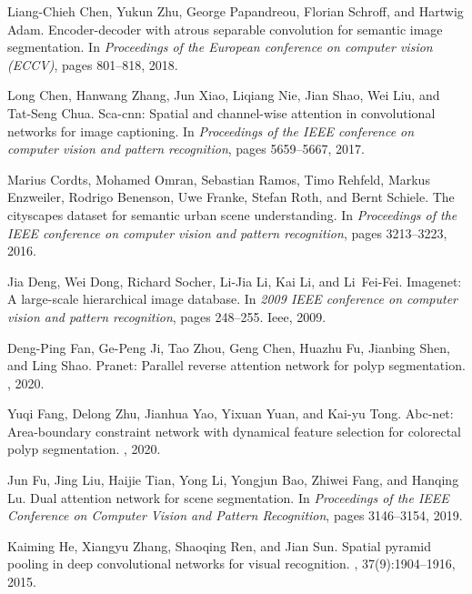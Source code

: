 \documentclass{article}
\begin{document}
\begin{thebibliography}{10}
Liang-Chieh Chen, Yukun Zhu, George Papandreou, Florian Schroff, and Hartwig
  Adam.
\newblock Encoder-decoder with atrous separable convolution for semantic image
  segmentation.
\newblock In {\em Proceedings of the European conference on computer vision
  (ECCV)}, pages 801--818, 2018.

Long Chen, Hanwang Zhang, Jun Xiao, Liqiang Nie, Jian Shao, Wei Liu, and
  Tat-Seng Chua.
\newblock Sca-cnn: Spatial and channel-wise attention in convolutional networks
  for image captioning.
\newblock In {\em Proceedings of the IEEE conference on computer vision and
  pattern recognition}, pages 5659--5667, 2017.

Marius Cordts, Mohamed Omran, Sebastian Ramos, Timo Rehfeld, Markus Enzweiler,
  Rodrigo Benenson, Uwe Franke, Stefan Roth, and Bernt Schiele.
\newblock The cityscapes dataset for semantic urban scene understanding.
\newblock In {\em Proceedings of the IEEE conference on computer vision and
  pattern recognition}, pages 3213--3223, 2016.

Jia Deng, Wei Dong, Richard Socher, Li-Jia Li, Kai Li, and Li~Fei-Fei.
\newblock Imagenet: A large-scale hierarchical image database.
\newblock In {\em 2009 IEEE conference on computer vision and pattern
  recognition}, pages 248--255. Ieee, 2009.

Deng-Ping Fan, Ge-Peng Ji, Tao Zhou, Geng Chen, Huazhu Fu, Jianbing Shen, and
  Ling Shao.
\newblock Pranet: Parallel reverse attention network for polyp segmentation.
, 2020.

Yuqi Fang, Delong Zhu, Jianhua Yao, Yixuan Yuan, and Kai-yu Tong.
\newblock Abc-net: Area-boundary constraint network with dynamical feature
  selection for colorectal polyp segmentation.
, 2020.

Jun Fu, Jing Liu, Haijie Tian, Yong Li, Yongjun Bao, Zhiwei Fang, and Hanqing
  Lu.
\newblock Dual attention network for scene segmentation.
\newblock In {\em Proceedings of the IEEE Conference on Computer Vision and
  Pattern Recognition}, pages 3146--3154, 2019.

Kaiming He, Xiangyu Zhang, Shaoqing Ren, and Jian Sun.
\newblock Spatial pyramid pooling in deep convolutional networks for visual
  recognition.
,
  37(9):1904--1916, 2015.


\end{thebibliography}
\end{document}
